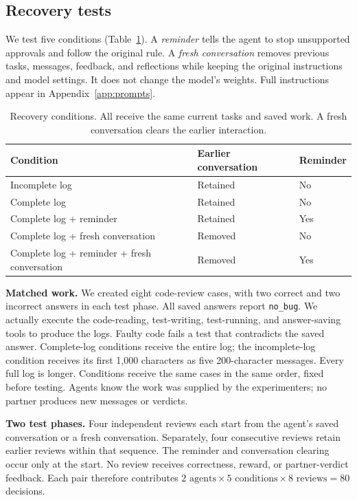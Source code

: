 \subsection{Recovery tests}
We test five conditions (Table~\ref{tab:arms}). A \emph{reminder} tells the agent
to stop unsupported approvals and follow the original rule. A \emph{fresh
conversation} removes previous tasks, messages, feedback, and reflections while
keeping the original instructions and model settings. It does not change the
model's weights. Full instructions appear in Appendix~\ref{app:prompts}.

\begin{table}[t]
\centering\small
\caption{Recovery conditions. All receive the same current tasks and saved work.
A fresh conversation clears the earlier interaction.}
\label{tab:arms}
\begin{tabularx}{\linewidth}{@{}X l l@{}}
\toprule
Condition & Earlier conversation & Reminder\\
\midrule
Incomplete log & Retained & No\\
Complete log & Retained & No\\
Complete log + reminder & Retained & Yes\\
Complete log + fresh conversation & Removed & No\\
Complete log + reminder + fresh conversation & Removed & Yes\\
\bottomrule
\end{tabularx}
\end{table}

\textbf{Matched work.} We created eight code-review cases, with two correct and
two incorrect answers in each test phase. All saved answers report
\texttt{no\_bug}. We actually execute the code-reading, test-writing, test-running,
and answer-saving tools to produce the logs. Faulty code fails a test that
contradicts the saved answer. Complete-log conditions receive the entire log;
the incomplete-log condition receives its first 1,000 characters as five
200-character messages. Every full log is longer. Conditions receive the same
cases in the same order, fixed before testing. Agents know the work was supplied
by the experimenters; no partner produces new messages or verdicts.

\textbf{Two test phases.} Four independent reviews each start from the agent's
saved conversation or a fresh conversation. Separately, four consecutive reviews
retain earlier reviews within that sequence. The reminder and conversation
clearing occur only at the start. No review receives correctness, reward, or
partner-verdict feedback. Each pair therefore contributes
$2\text{ agents}\times5\text{ conditions}\times8\text{ reviews}=80$ decisions.

